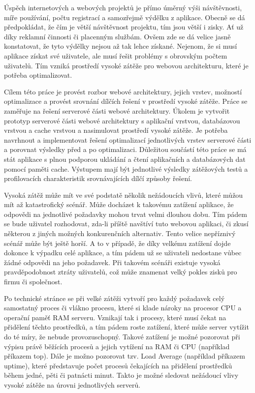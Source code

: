 \documentclass[12pt]{article}
\begin{document}
Úspěch internetových a webových projektů je přímo úměrný výši návštěvnosti, míře používání, počtu registrací a samozřejmě výdělku z aplikace. Obecně se dá předpokládat, že čím je větší návštěvnost projektu, tím jsou větší i zisky. Ať už díky reklamní činnosti či placenným službám. Ovšem zde se dá velice jasně konstatovat, že tyto výdělky nejsou až tak lehce získané. Nejenom, že si musí aplikace získat své uživatele, ale musí řešit problémy s obrovským počtem uživatelů. Tím vzniká prostředí vysoké zátěže pro webovou architekturu, které je potřeba optimalizovat.

Cílem této práce je provést rozbor webové architektury, jejich vrstev, možností optimalizace a provést srovnání dílčích řešení v prostředí vysoké zátěže. Práce se zaměřuje na řešení serverové části webové architektury. Úkolem je vytvořit prototyp serverové části webové architektury s aplikační vrstvou, databázovou vrstvou a cache vrstvou a nasimulovat prostředí vysoké zátěže. Je potřeba navrhnout a implementovat řešení optimalizací jednotlivých vrstev serverové části a porovnat výsledky před a po optimalizaci. Důležitou součástí této práce se má stát aplikace s plnou podporou ukládání a čtení aplikačních a databázových dat pomocí paměti cache. Výstupem mají být jednotlivé výsledky zátěžových testů a profilovacích charakteristik srovnávajících dílčí způsoby řešení.

Vysoká zátěž může mít ve své podstatě několik nežádoucích vlivů, které můžou mít až katastrofický scénář. Může docházet k takovému zatížení aplikace, že odpovědi na jednotlivé požadavky mohou trvat velmi dlouhou dobu. Tím pádem se bude uživatel rozhodovat, zda-li příště navštíví tuto webovou aplikaci, či zkusí některou z jiných možných konkurenčních alternativ. Tento velice nepříznivý scénář může být ještě horší. A to v případě, že díky velkému zatížení dojde dokonce k výpadku celé aplikace, a tím pádem už se uživateli nedostane vůbec žádné odpovědi na jeho požadavek. Při takovém scénáři existuje vysoká pravděpodobnost ztráty uživatelů, což může znamenat velký pokles zisků pro firmu či společnost.

Po technické stránce se při velké zátěži vytvoří pro každý požadavek celý samostatný proces či vlákno procesu, které si klade nároky na procesor CPU a operační paměť RAM serveru. Vznikají tak i procesy, které musí čekat na přidělení těchto prostředků, a tím pádem roste zatížení, které může server vytížit do té míry, že nebude provozuschopný. Takové zatížení je možné pozorovat při výpisu právě běžících procesů a jejich vytížení na RAM či CPU (například příkazem top). Dále je možno pozorovat tzv. Load Average (například příkazem uptime), které představuje počet procesů čekajících na přidělení prostředků během jedné, pěti či patnácti minut. Takto je možné sledovat nežádoucí vlivy vysoké zátěže na úrovni jednotlivých serverů.\cite{sledovani-zatizeni}
\end{document}
